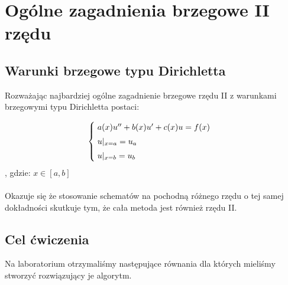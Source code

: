 \section{Ogólne zagadnienia brzegowe II rzędu}
\subsection{Warunki brzegowe typu Dirichletta}

Rozważając najbardziej ogólne zagadnienie brzegowe rzędu II z warunkami brzegowymi typu Dirichletta postaci:

\[
\begin{cases}
\vspace{0.1cm} 
\hspace{0,1cm} a(x) u'' + b(x)u' + c(x)u =f(x) \\
\vspace{0.1cm}
\hspace{0,1cm}u|_{x=a} = u_{a} \\
\hspace{0,1cm}u|_{x=b} = u_{b}
\end{cases}
\]
, gdzie:
$x\in[a,b]$
\\
\\
Okazuje się że stosowanie schematów na pochodną różnego rzędu o tej samej dokładności skutkuje tym, że cała metoda jest również rzędu II.

\subsection{Cel ćwiczenia}
Na laboratorium otrzymaliśmy następujące równania dla których mieliśmy stworzyć rozwiązujący je algorytm.

